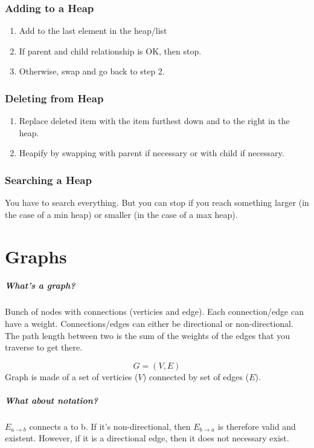 \documentclass[a4paper,12pt]{report}
\begin{document}
\subsection{Adding to a Heap}
\begin{enumerate}
\item Add to the last element in the heap/list
\item If parent and child relationship is OK, then stop.
\item Otherwise, swap and go back to step 2.
\end{enumerate}

\subsection{Deleting from Heap}
\begin{enumerate}
\item Replace deleted item with the item furthest down and to the right in the heap.
\item Heapify by swapping with parent if necessary or with child if necessary.
\end{enumerate}

\subsection{Searching a Heap}
You have to search everything. But you can stop if you reach something larger (in the case of a min heap) or smaller (in the case of a max heap). 

\chapter{Graphs}
\paragraph{What's a graph? } Bunch of nodes with connections (verticies and edge). Each connection/edge can have a weight. Connections/edges can either be directional or non-directional. The path length between two is the sum of the weights of the edges that you traverse to get there. 

$$G = (V, E)$$
Graph is made of a set of verticies ($V$) connected by set of edges ($E$).

\paragraph{What about notation? } $E_{a \to b}$ connects a to b. If it's non-directional, then $E_{b \to a}$ is therefore valid and existent. However, if it is a directional edge, then it does not necessary exist.
\end{document}
